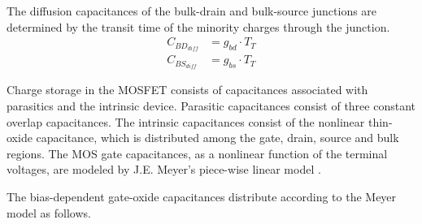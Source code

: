 \documentclass[10pt]{report}
\begin{document}
The diffusion capacitances of the bulk-drain and bulk-source junctions
are determined by the transit time of the minority charges through the
junction.
\begin{align}
C_{BD_{diff}} &= g_{bd}\cdot T_T\\
C_{BS_{diff}} &= g_{bs}\cdot T_T
\end{align}

Charge storage in the MOSFET consists of capacitances associated with
parasitics and the intrinsic device.  Parasitic capacitances consist
of three constant overlap capacitances.  The intrinsic capacitances
consist of the nonlinear thin-oxide capacitance, which is distributed
among the gate, drain, source and bulk regions.  The MOS gate
capacitances, as a nonlinear function of the terminal voltages, are
modeled by J.E. Meyer's piece-wise linear model \cite{Meyer}.

\addvspace{12pt}

The bias-dependent gate-oxide capacitances distribute according to the
Meyer model \cite{Meyer} as follows.
\end{document}
